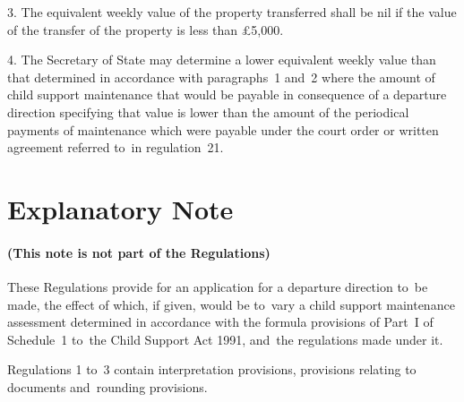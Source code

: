 \documentclass[12pt,a4paper]{article}
\begin{document}

\medskip

3.
The equivalent weekly value of the property transferred shall be nil if the
value of the transfer of the property is less than £5,000.

\medskip

4. The Secretary of State may determine a lower equivalent weekly value than that determined in accordance with paragraphs~1 and~2 where the amount of child support maintenance that would be payable in consequence of a departure direction specifying that value is lower than the amount of 
the periodical payments of maintenance which were  %
payable under the court order or written agreement referred to~in regulation~21.


%



\part{Explanatory Note}

\renewcommand\parthead{--- Explanatory Note}

\subsection*{(This note is not part of the Regulations)}

These Regulations provide for an application for a departure direction to~be
made, the effect of which, if given, would be to~vary a child support
maintenance assessment determined in accordance with the formula provisions of
Part~I of Schedule~1 to~the Child Support Act 1991, and~the regulations made
under it.

Regulations 1 to~3 contain interpretation provisions, provisions relating to
documents and~rounding provisions.
\end{document}
